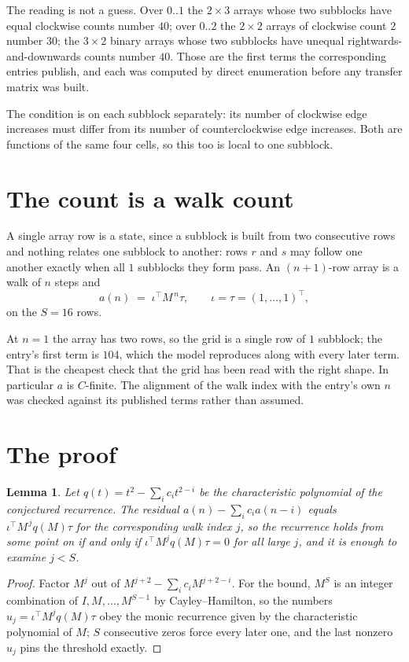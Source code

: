 \documentclass[11pt,a4paper]{article}
\theoremstyle{plain}
\newtheorem{lemma}[theorem]{Lemma}
\theoremstyle{definition}
\begin{document}
The reading is not a guess. Over $0..1$ the $2\times3$ arrays whose two subblocks have equal
clockwise counts number $40$; over $0..2$ the $2\times2$ arrays of clockwise count $2$ number
$30$; the $3\times2$ binary arrays whose two subblocks have unequal rightwards-and-downwards
counts number $40$. Those are the first terms the corresponding entries publish, and each was
computed by direct enumeration before any transfer matrix was built.

The condition is on each subblock separately: its number of clockwise edge increases must differ from its number
of counterclockwise edge increases. Both are functions of the same four cells, so this too is local to one
subblock.

\section{The count is a walk count}

A single array row is a state, since a subblock is built from two
consecutive rows and nothing relates one subblock to another: rows $r$ and $s$ may follow one
another exactly when all $1$ subblocks they form pass. An $(n+1)$-row array is a walk of $n$
steps and
\[
a(n)\;=\;\iota^{\!\top}M^{\,n}\tau,\qquad\iota=\tau=(1,\dots,1)^{\!\top},
\]
on the $S=16$ rows.

At $n=1$ the array has two rows, so the grid is a single row of $1$
subblock; the entry's first term is $104$, which the model
reproduces along with every later term. That is the cheapest check that the grid has been read
with the right shape.
In particular $a$ is $C$-finite. The alignment of the walk index with the entry's own $n$ was
checked against its published terms rather than assumed.

\section{The proof}

\begin{lemma}\label{lem:crit}
Let $q(t)=t^{2}-\sum_i c_it^{2-i}$ be the characteristic polynomial of the
conjectured recurrence. The residual $a(n)-\sum_ic_ia(n-i)$ equals
$\iota^{\!\top}M^{\,j}q(M)\tau$ for the corresponding walk index $j$, so the recurrence
holds from some point on if and only if $\iota^{\!\top}M^{j}q(M)\tau=0$ for all large $j$,
and it is enough to examine $j<S$.
\end{lemma}

\begin{proof}
Factor $M^{j}$ out of $M^{j+2}-\sum_ic_iM^{j+2-i}$. For the bound, $M^{S}$
is an integer combination of $I,M,\dots,M^{S-1}$ by Cayley--Hamilton, so the numbers
$u_j=\iota^{\!\top}M^{j}q(M)\tau$ obey the monic recurrence given by the characteristic
polynomial of $M$; $S$ consecutive zeros force every later one, and the last nonzero $u_j$
pins the threshold exactly.
\end{proof}
\end{document}
